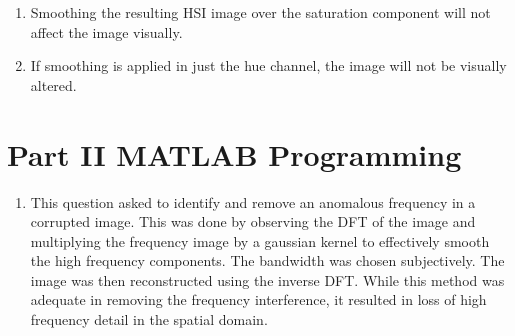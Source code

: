 \documentclass{article}[12 pt]
\begin{document}
\begin{enumerate}
\begin{enumerate}[label=\alph*]
		\item Smoothing the resulting HSI image over the saturation component will not affect the image visually.

		\item If smoothing is applied in just the hue channel, the image  will not be visually altered.
	\end{enumerate}

\end{enumerate}

\section*{Part II MATLAB Programming}
\begin{enumerate}
\item This question asked to identify and remove an anomalous frequency in a corrupted image.  This was done by observing the DFT of the image and multiplying the frequency image by a gaussian kernel to effectively smooth the high frequency components.  The bandwidth was chosen subjectively.  The image was then reconstructed using the inverse DFT.  While this method was adequate in removing the frequency interference, it resulted in loss of high frequency detail in the spatial domain.


\end{enumerate}
\end{document}

